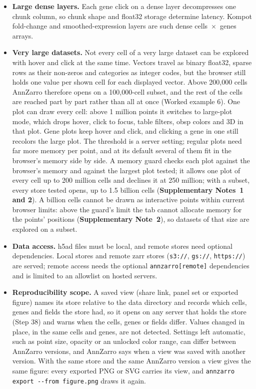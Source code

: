 \begin{itemize}
\item
  \textbf{Large dense layers.} Each gene click on a dense layer decompresses one chunk column, so chunk shape and float32 storage determine latency. Kompot fold-change and smoothed-expression layers are such dense cells~$\times$~genes arrays.
\item
  \textbf{Very large datasets.} Not every cell of a very large dataset can be explored with hover and click at the same time. Vectors travel as binary float32, sparse rows as their non-zeros and categories as integer codes, but the browser still holds one value per shown cell for each displayed vector. Above 200,000 cells AnnZarro therefore opens on a 100,000-cell subset, and the rest of the cells are reached part by part rather than all at once (Worked example 6). One plot can draw every cell: above 1 million points it switches to large-plot mode, which drops hover, click to focus, table filters, obsp colors and 3D in that plot. Gene plots keep hover and click, and clicking a gene in one still recolors the large plot. The threshold is a server setting; regular plots need far more memory per point, and at its default several of them fit in the browser's memory side by side. A memory guard checks each plot against the browser's memory and against the largest plot tested; it allows one plot of every cell up to 200 million cells and declines it at 250 million; with a subset, every store tested opens, up to 1.5 billion cells (\textbf{Supplementary Notes~1 and 2}). A billion cells cannot be drawn as interactive points within current browser limits: above the guard's limit the tab cannot allocate memory for the points' positions (\textbf{Supplementary Note~2}), so datasets of that size are explored on a subset. %
\item
  \textbf{Data access.} h5ad files must be local, and remote stores need optional dependencies. Local stores and remote zarr stores (\texttt{s3://}, \texttt{gs://}, \texttt{https://}) are served; remote access needs the optional \texttt{annzarro[remote]} dependencies and is limited to an allowlist on hosted servers.
\item
  \textbf{Reproducibility scope.} A saved view (share link, panel set or exported figure) names its store relative to the data directory and records which cells, genes and fields the store had, so it opens on any server that holds the store (Step 38) and warns when the cells, genes or fields differ. Values changed in place, in the same cells and genes, are not detected. Settings left automatic, such as point size, opacity or an unlocked color range, can differ between AnnZarro versions, and AnnZarro says when a view was saved with another version. With the same store and the same AnnZarro version a view gives the same figure: every exported PNG or SVG carries its view, and \passthrough{\lstinline!annzarro export --from figure.png!} draws it again.

\end{itemize}
